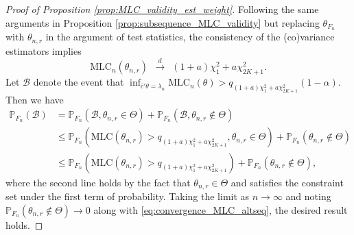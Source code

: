 \documentclass[11pt]{article}
\theoremstyle{definition}
\newcommand{\Prob}{\ensuremath{\mathbb{P}}} %
\newcommand{\0}{\ensuremath{\mathbf{0}}}
\begin{document}
\begin{bibunit}
\begin{proof}[Proof of Proposition \ref{prop:MLC_validity_est_weight}]
Following the same arguments in Proposition \ref{prop:subsequence_MLC_validity} but replacing $\theta_{F_n}$ with $\theta_{n,r}$ in the argument of test statistics, the consistency of the (co)variance estimators implies
\begin{equation}
\label{eq:convergence_MLC_altseq}
    \text{MLC}_n(\theta_{n,r}) ~~\xrightarrow{d}~~ (1+a)\chi_1^2 + a\chi_{2K+1}^2.
\end{equation}
Let $\mathcal{B}$ denote the event that $\inf_{\hat{c}'\theta = \lambda_n} \text{MLC}_n(\theta) > q_{(1+a)\chi_1^2 + a\chi_{2K+1}^2} (1-\alpha)$. 
Then we have 
\begin{align*}
    \Prob_{F_n}(\mathcal{B})
    & = 
    \Prob_{F_n}(\mathcal{B}, \theta_{n,r}\in\Theta) + \Prob_{F_n}(\mathcal{B}, \theta_{n,r}\not\in\Theta) \\
    & \leq
    \Prob_{F_n}(\text{MLC}(\theta_{n,r}) > q_{(1+a)\chi_1^2 + a\chi_{2K+1}^2}, \theta_{n,r}\in\Theta) + \Prob_{F_n}(\theta_{n,r}\not\in \Theta) \\
    & \leq 
    \Prob_{F_n}(\text{MLC}(\theta_{n,r}) > q_{(1+a)\chi_1^2 + a\chi_{2K+1}^2}) + \Prob_{F_n}(\theta_{n,r}\not\in \Theta),
\end{align*}
where the second line holds by the fact that $\theta_{n,r} \in \Theta$ and satisfies the constraint set under the first term of probability.  Taking the limit as $n \to \infty$ and noting $\Prob_{F_n}(\theta_{n,r}\not\in\Theta) \to 0$ along with \eqref{eq:convergence_MLC_altseq}, the desired result holds.
\end{proof}





%
%
%
%
%
%
%
%
%
%
%
%
%
%
%

%
%
%
%
%
%
%
%
%
%
%
%
%
%
%

%

%
%
%
 
%
 
%
%
%
%
%
%
%
%
%
%
%
%
%
%
%
%
%
%
%
%
%
%
%
%
%
%
%
%
%
%
%
%
%
%
%
%
%
%
%
%
%
%
%
%
%
%
%
%
%
%
%

%
%
%
%
%
%
%
%
%
%
%
%
%
%

%
%
%
%
%




%


\newpage

%

\end{bibunit}
\end{document}
